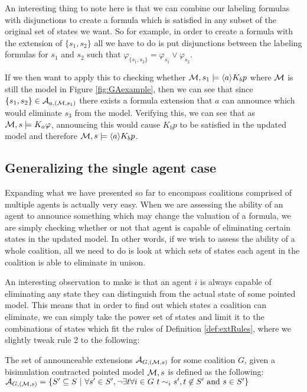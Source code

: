 An interesting thing to note here is that we can combine our labeling formulas with disjunctions to create a formula which is satisfied in any subset of the original set of states we want. So for example, in order to create a formula with the extension of $\{s_1,s_2\}$ all we have to do is put disjunctions between the labeling formulas for $s_1$ and $s_2$ such that $\varphi_{\{s_1,s_2\}} = \varphi_{s_1} \vee \varphi_{s_2}$.

If we then want to apply this to checking whether $\mathcal{M},s_1 \models \langle a\rangle K_bp$ where $\mathcal{M}$ is still the model in Figure \ref{fig:GAexample}, then we can see that since $\{s_1,s_2\}\in\mathcal{A}_{a,(\mathcal{M},s_1)}$ there exists a formula extension that $a$ can announce which would eliminate $s_3$ from the model. Verifying this, we can see that as $\mathcal{M},s \models K_a\varphi$, announcing this would cause $K_bp$ to be satisfied in the updated model and therefore $\mathcal{M},s \models \langle a\rangle K_bp$.

\subsection{Generalizing the single agent case}

Expanding what we have presented so far to encompass coalitions comprised of multiple agents is actually very easy. 
When we are assessing the ability of an agent to announce something which may change the valuation of a formula, we are simply checking whether or not that agent is capable of eliminating certain states in the updated model. In other words, if we wish to assess the ability of a whole coalition, all we need to do is look at which sets of states each agent in the coalition is able to eliminate in unison.

An interesting observation to make is that an agent $i$ is always capable of eliminating any state they can distinguish from the actual state of some pointed model. This means that in order to find out which states a coalition can eliminate, we can simply take the power set of states and limit it to the combinations of states which fit the rules of Definition \ref{def:extRules}, where we slightly tweak rule 2 to the following:

\begin{definition}
	\label{def:extscoal}
	The set of announceable extensions $\mathcal{A}_{G,(\mathcal{M},s)}$ for some coalition $G$, given a bisimulation contracted pointed model $\mathcal{M},s$ is defined as the following: \\
	$\mathcal{A}_{G,(\mathcal{M},s)} = \{S' \subseteq S ~|~ \forall s'\in S', \neg\exists t\forall i\in G ~ t\sim_i s', t\not\in S' \textrm{ and } s\in S'\}$
\end{definition}

